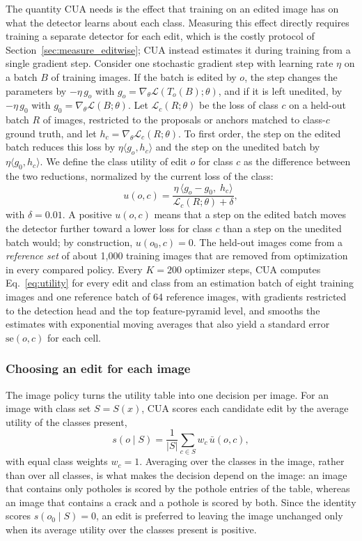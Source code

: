 \documentclass[conference]{IEEEtran}
\begin{document}
The quantity CUA needs is the effect that training on an edited image has on what the detector learns about each class. Measuring this effect directly requires training a separate detector for each edit, which is the costly protocol of Section~\ref{sec:measure_editwise}; CUA instead estimates it during training from a single gradient step. Consider one stochastic gradient step with learning rate $\eta$ on a batch $B$ of training images. If the batch is edited by $o$, the step changes the parameters by $-\eta\,g_o$ with $g_o=\nabla_\theta\mathcal{L}(T_o(B);\theta)$, and if it is left unedited, by $-\eta\,g_0$ with $g_0=\nabla_\theta\mathcal{L}(B;\theta)$. Let $\mathcal{L}_c(R;\theta)$ be the loss of class $c$ on a held-out batch $R$ of images, restricted to the proposals or anchors matched to class-$c$ ground truth, and let $h_c=\nabla_\theta\mathcal{L}_c(R;\theta)$. To first order, the step on the edited batch reduces this loss by $\eta\langle g_o,h_c\rangle$ and the step on the unedited batch by $\eta\langle g_0,h_c\rangle$. We define the class utility of edit $o$ for class $c$ as the difference between the two reductions, normalized by the current loss of the class:
\begin{equation}
u(o,c)=\frac{\eta\,\langle g_o-g_0,\;h_c\rangle}{\mathcal{L}_c(R;\theta)+\delta},
\label{eq:utility}
\end{equation}
with $\delta=0.01$. A positive $u(o,c)$ means that a step on the edited batch moves the detector further toward a lower loss for class $c$ than a step on the unedited batch would; by construction, $u(o_0,c)=0$. The held-out images come from a \emph{reference set} of about 1,000 training images that are removed from optimization in every compared policy. Every $K=200$ optimizer steps, CUA computes Eq.~\eqref{eq:utility} for every edit and class from an estimation batch of eight training images and one reference batch of 64 reference images, with gradients restricted to the detection head and the top feature-pyramid level, and smooths the estimates with exponential moving averages that also yield a standard error $\mathrm{se}(o,c)$ for each cell.

\subsubsection{Choosing an edit for each image}
\label{sec:method_policy}

The image policy turns the utility table into one decision per image. For an image with class set $S=S(x)$, CUA scores each candidate edit by the average utility of the classes present,
\begin{equation}
s(o\mid S)=\frac{1}{|S|}\sum_{c\in S}w_c\,\bar u(o,c),
\label{eq:score}
\end{equation}
with equal class weights $w_c=1$. Averaging over the classes in the image, rather than over all classes, is what makes the decision depend on the image: an image that contains only potholes is scored by the pothole entries of the table, whereas an image that contains a crack and a pothole is scored by both. Since the identity scores $s(o_0\mid S)=0$, an edit is preferred to leaving the image unchanged only when its average utility over the classes present is positive.
\end{document}
